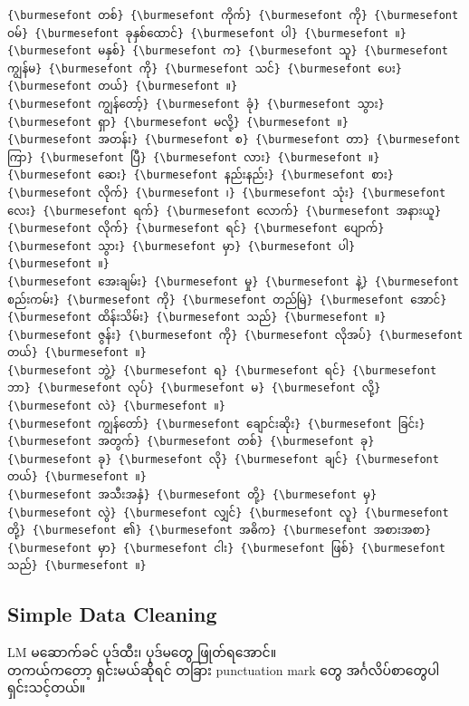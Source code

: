 \documentclass[11pt]{article}
\begin{document}
    \begin{Verbatim}[commandchars=\\\{\}]
{\burmesefont တစ်} {\burmesefont ကိုက်} {\burmesefont ကို} {\burmesefont ဝမ်} {\burmesefont ခုနှစ်ထောင်} {\burmesefont ပါ} {\burmesefont ။}
{\burmesefont မနှစ်} {\burmesefont က} {\burmesefont သူ} {\burmesefont ကျွန်မ} {\burmesefont ကို} {\burmesefont သင်} {\burmesefont ပေး} {\burmesefont တယ်} {\burmesefont ။}
{\burmesefont ကျွန်တော့်} {\burmesefont ခုံ} {\burmesefont သွား} {\burmesefont ရှာ} {\burmesefont မလို့} {\burmesefont ။}
{\burmesefont အတန်း} {\burmesefont စ} {\burmesefont တာ} {\burmesefont ကြာ} {\burmesefont ပြီ} {\burmesefont လား} {\burmesefont ။}
{\burmesefont ဆေး} {\burmesefont နည်းနည်း} {\burmesefont စား} {\burmesefont လိုက်} {\burmesefont ၊} {\burmesefont သုံး} {\burmesefont လေး} {\burmesefont ရက်} {\burmesefont လောက်} {\burmesefont အနားယူ} {\burmesefont လိုက်} {\burmesefont ရင်} {\burmesefont ပျောက်} {\burmesefont သွား} {\burmesefont မှာ} {\burmesefont ပါ}
{\burmesefont ။}
{\burmesefont အေးချမ်း} {\burmesefont မှု} {\burmesefont နဲ့} {\burmesefont စည်းကမ်း} {\burmesefont ကို} {\burmesefont တည်မြဲ} {\burmesefont အောင်} {\burmesefont ထိန်းသိမ်း} {\burmesefont သည်} {\burmesefont ။}
{\burmesefont ဇွန်း} {\burmesefont ကို} {\burmesefont လိုအပ်} {\burmesefont တယ်} {\burmesefont ။}
{\burmesefont ဘွဲ့} {\burmesefont ရ} {\burmesefont ရင်} {\burmesefont ဘာ} {\burmesefont လုပ်} {\burmesefont မ} {\burmesefont လို့} {\burmesefont လဲ} {\burmesefont ။}
{\burmesefont ကျွန်တော်} {\burmesefont ချောင်းဆိုး} {\burmesefont ခြင်း} {\burmesefont အတွက်} {\burmesefont တစ်} {\burmesefont ခု} {\burmesefont ခု} {\burmesefont လို} {\burmesefont ချင်} {\burmesefont တယ်} {\burmesefont ။}
{\burmesefont အသီးအနှံ} {\burmesefont တို့} {\burmesefont မှ} {\burmesefont လွဲ} {\burmesefont လျှင်} {\burmesefont လူ} {\burmesefont တို့} {\burmesefont ၏} {\burmesefont အဓိက} {\burmesefont အစားအစာ} {\burmesefont မှာ} {\burmesefont ငါး} {\burmesefont ဖြစ်} {\burmesefont သည်} {\burmesefont ။}
    \end{Verbatim}

    \hypertarget{simple-data-cleaning}{%
\subsection{Simple Data Cleaning}\label{simple-data-cleaning}}

LM {\burmesefont မဆောက်ခင်} {\burmesefont ပုဒ်ထီး၊} {\burmesefont ပုဒ်မတွေ} {\burmesefont ဖြုတ်ရအောင်။}\\
{\burmesefont တကယ်ကတော့} {\burmesefont ရှင်းမယ်ဆိုရင်} {\burmesefont တခြား} punctuation mark {\burmesefont တွေ} {\burmesefont အင်္ဂလိပ်စာတွေပါ} {\burmesefont ရှင်းသင့်တယ်။}
\end{document}
